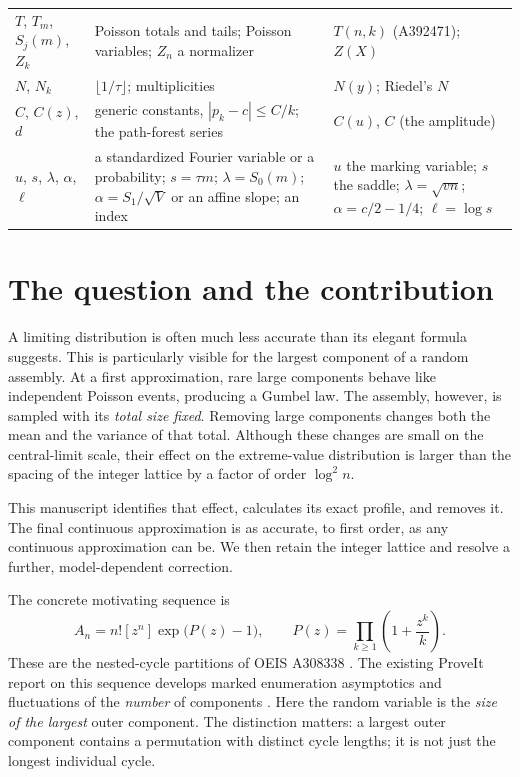 \documentclass[11pt,letterpaper]{article}
\numberwithin{equation}{section}
\theoremstyle{remark}\newtheorem{remark}[theorem]{Remark}
\theoremstyle{definition}\newtheorem{definition}[theorem]{Definition}\theoremstyle{plain}
\begin{document}
\begin{longtable}{@{}>{\raggedright\arraybackslash}p{0.95in}>{\raggedright\arraybackslash}p{3.0in}>{\raggedright\arraybackslash}p{2.2in}@{}}
$T$, $T_m$, $S_j(m)$, $Z_k$ & Poisson totals and tails; Poisson variables; $Z_n$ a normalizer & $T(n,k)$ (A392471); $Z(X)$\\
$N$, $N_k$ & $\lfloor1/\tau\rfloor$; multiplicities & $N(y)$; Riedel's $N$\\
$C$, $C(z)$, $d$ & generic constants, $|p_k-c|\le C/k$; the path-forest series & $C(u)$, $C$ (the amplitude)\\
$u$, $s$, $\lambda$, $\alpha$, $\ell$ & a standardized Fourier variable or a probability; $s=\tau m$; $\lambda=S_0(m)$; $\alpha=S_1/\sqrt V$ or an affine slope; an index & $u$ the marking variable; $s$ the saddle; $\lambda=\sqrt{vn}$; $\alpha=c/2-1/4$; $\ell=\log s$\\
\bottomrule
\end{longtable}
\addtocounter{table}{-1}%
\endgroup

\section{The question and the contribution}\label{ncy:gb:sec:intro}

A limiting distribution is often much less accurate than its elegant
formula suggests. This is particularly visible for the largest component
of a random assembly. At a first approximation, rare large components
behave like independent Poisson events, producing a Gumbel law. The
assembly, however, is sampled with its \emph{total size fixed}. Removing
large components changes both the mean and the variance of that total.
Although these changes are small on the central-limit scale, their
effect on the extreme-value distribution is larger than the spacing of
the integer lattice by a factor of order \(\log^2 n\).

This manuscript identifies that effect, calculates its exact profile,
and removes it. The final continuous approximation is as accurate, to
first order, as any continuous approximation can be. We then retain the
integer lattice and resolve a further, model-dependent correction.

The concrete motivating sequence is
\begin{equation}\label{ncy:gb:eq:nested-egf}
 A_n=n![z^n]\exp\bigl(P(z)-1\bigr),
 \qquad P(z)=\prod_{k\ge1}\left(1+\frac{z^k}{k}\right).
\end{equation}
These are the nested-cycle partitions of OEIS A308338
\cite{oeis308338}. The existing ProveIt report on this sequence develops
marked enumeration asymptotics and fluctuations of the \emph{number}
of components \cite{ProveItNested}. Here the random variable is the
\emph{size of the largest} outer component. The distinction matters:
a largest outer component contains a permutation with distinct cycle
lengths; it is not just the longest individual cycle.
\end{document}
